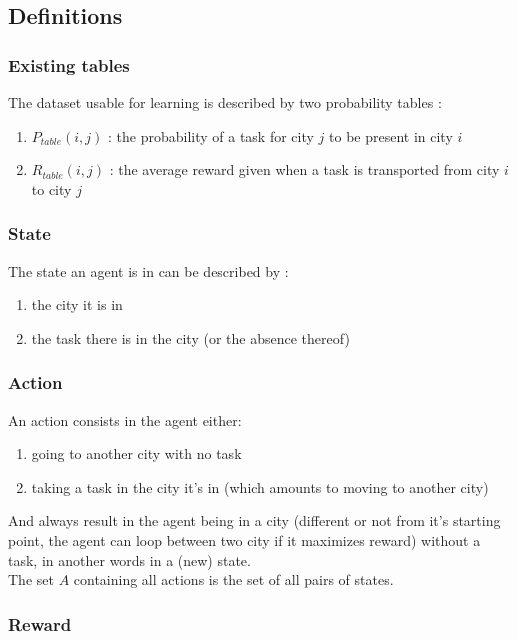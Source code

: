 \documentclass[11pt]{article}
\begin{document}
\subsection{Definitions}

\subsubsection{Existing tables}

The dataset usable for learning is described by two probability tables :

\begin{enumerate}
    \item $P_{table}(i,j)$ : the probability of a task for city $j$ to be present in city $i$
    \item $R_{table}(i,j)$ : the average reward given when a task is transported from city $i$ to city $j$
\end{enumerate}

\subsubsection{State} 
The state an agent is in can be described by :

\begin{enumerate}
    \item the city it is in
    \item the task there is in the city (or the absence thereof)
\end{enumerate}

\subsubsection{Action}
An action consists in the agent either:
\begin{enumerate}
    \item going to another city with no task
    \item taking a task in the city it's in (which amounts to moving to another city)
\end{enumerate}
And always result in the agent being in a city (different or not from it's starting point, the agent can loop between two city if it maximizes reward) without a task, in another words in a (new) state. \\

The set $A$ containing all actions is the set of all pairs of states.
\subsubsection{Reward}
\end{document}
